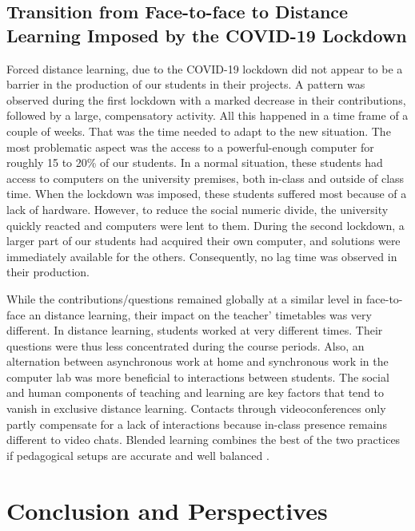 \documentclass{aims}
\theoremstyle{definition}
\begin{document}
\hypertarget{transition-from-face-to-face-to-distance-learning-imposed-by-the-covid-19-lockdown-2}{%
\subsection{Transition from Face-to-face to Distance Learning Imposed by
the COVID-19
Lockdown}\label{transition-from-face-to-face-to-distance-learning-imposed-by-the-covid-19-lockdown-2}}

Forced distance learning, due to the COVID-19 lockdown did not appear to
be a barrier in the production of our students in their projects. A
pattern was observed during the first lockdown with a marked decrease in
their contributions, followed by a large, compensatory activity. All
this happened in a time frame of a couple of weeks. That was the time
needed to adapt to the new situation. The most problematic aspect was
the access to a powerful-enough computer for roughly 15 to 20\% of our
students. In a normal situation, these students had access to computers
on the university premises, both in-class and outside of class time.
When the lockdown was imposed, these students suffered most because of a
lack of hardware. However, to reduce the social numeric divide, the
university quickly reacted and computers were lent to them. During the
second lockdown, a larger part of our students had acquired their own
computer, and solutions were immediately available for the others.
Consequently, no lag time was observed in their production.

While the contributions/questions remained globally at a similar level
in face-to-face an distance learning, their impact on the teacher'
timetables was very different. In distance learning, students worked at
very different times. Their questions were thus less concentrated during
the course periods. Also, an alternation between asynchronous work at
home and synchronous work in the computer lab was more beneficial to
interactions between students. The social and human components of
teaching and learning are key factors that tend to vanish in exclusive
distance learning. Contacts through videoconferences only partly
compensate for a lack of interactions because in-class presence remains
different to video chats. Blended learning combines the best of the two
practices if pedagogical setups are accurate and well balanced
\cite{Bernard2014}.

\hypertarget{conclusion-and-perspectives}{%
\section{Conclusion and
Perspectives}\label{conclusion-and-perspectives}}
\end{document}
